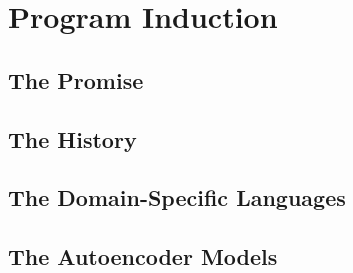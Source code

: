 \usepackage{lipsum}




\coverpage{\TITLE}{\SUBTITLE}{\AUTHOR}{\DATE}{\SUBJECT}
\newpage
\tableofcontents

\listoffigures

\listoftables


\printnomenclature

\part{Program Induction}
\newpage
\chapter{The Promise} \label{ch:ps-motiv}

\newpage
\chapter{The History}\label{ch:ps-sota}


\newpage
\chapter{The Domain-Specific Languages}\label{ch:ps-dsl}



\newpage
\chapter{The Autoencoder Models}\label{ch:ps-autoenc}


